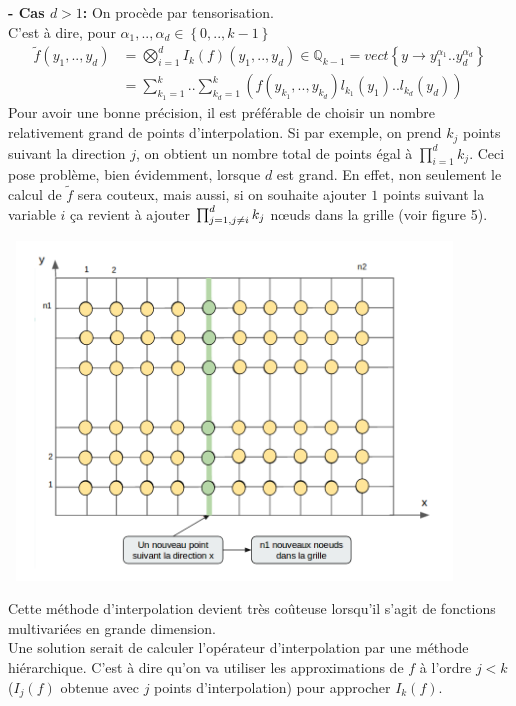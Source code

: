\vspace{1cm}
\hspace{0.5cm}
\textbf{ - Cas $d>1$: }
On procède par tensorisation. \\
C'est à dire, pour $\alpha_1,..,\alpha_d \in \left \{0,.., k-1 \right \}$ \\
\begin{align}
   \tilde{f} (y_1,..,y_d)& = \bigotimes_{i=1}^d I_k (f)(y_1,..,y_d) \in \mathbb{Q}_{k-1} = vect \left \{ y \rightarrow y_1^{\alpha_1}..y_d^{\alpha_d} \right \} \\
	 & = \sum_{k_1=1}^k..\sum_{k_d=1}^k (f(y_{k_1},..,y_{k_d}) l_{k_1}(y_1)..l_{k_d}(y_d)) \nonumber
\end{align}
\hspace{0.5cm}
Pour avoir une bonne précision, il est préférable de choisir un nombre relativement grand de points d'interpolation.
Si par exemple, on prend $k_j$ points suivant la direction $j$, on obtient un nombre total de points égal à $\prod_{i=1}^d k_j$.
Ceci pose problème, bien évidemment, lorsque $d$ est grand. En effet, non seulement le calcul de $\tilde{f}$ sera couteux, mais aussi,
si on souhaite ajouter $1$ points suivant la variable $i$ ça revient à ajouter $\prod_{j=1,\\ j \neq i}^d k_j$ nœuds dans la grille (voir figure 5).

\begin{center}
\includegraphics[height=9cm,width=12cm]{images/grille.png}
\end{center}

Cette méthode d'interpolation devient très coûteuse lorsqu'il s'agit de fonctions multivariées en grande dimension.\\
Une solution serait de calculer l'opérateur d'interpolation par une méthode hiérarchique. C'est à dire qu'on va
utiliser les approximations de $f$ à l'ordre $j<k$ ($I_{j}(f)$ obtenue avec $j$ points d'interpolation) pour approcher $I_{k}(f)$.

